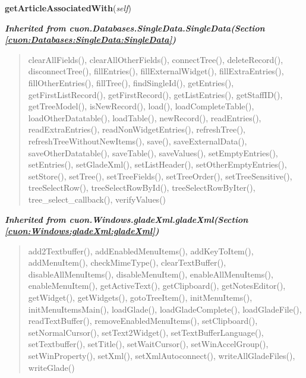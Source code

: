     \vspace{0.5ex}

\hspace{.8\funcindent}\begin{boxedminipage}{\funcwidth}

    \raggedright \textbf{getArticleAssociatedWith}(\textit{self})

\setlength{\parskip}{2ex}
\setlength{\parskip}{1ex}
    \end{boxedminipage}


\large{\textbf{\textit{Inherited from cuon.Databases.SingleData.SingleData\textit{(Section \ref{cuon:Databases:SingleData:SingleData})}}}}

\begin{quote}
clearAllFields(), clearAllOtherFields(), connectTree(), deleteRecord(), disconnectTree(), fillEntries(), fillExternalWidget(), fillExtraEntries(), fillOtherEntries(), fillTree(), findSingleId(), getEntries(), getFirstListRecord(), getFirstRecord(), getListEntries(), getStaffID(), getTreeModel(), isNewRecord(), load(), loadCompleteTable(), loadOtherDatatable(), loadTable(), newRecord(), readEntries(), readExtraEntries(), readNonWidgetEntries(), refreshTree(), refreshTreeWithoutNewItems(), save(), saveExternalData(), saveOtherDatatable(), saveTable(), saveValues(), setEmptyEntries(), setEntries(), setGladeXml(), setListHeader(), setOtherEmptyEntries(), setStore(), setTree(), setTreeFields(), setTreeOrder(), setTreeSensitive(), treeSelectRow(), treeSelectRowById(), treeSelectRowByIter(), tree\_select\_callback(), verifyValues()
\end{quote}

\large{\textbf{\textit{Inherited from cuon.Windows.gladeXml.gladeXml\textit{(Section \ref{cuon:Windows:gladeXml:gladeXml})}}}}

\begin{quote}
add2Textbuffer(), addEnabledMenuItems(), addKeyToItem(), addMenuItem(), checkMimeType(), clearTextBuffer(), disableAllMenuItems(), disableMenuItem(), enableAllMenuItems(), enableMenuItem(), getActiveText(), getClipboard(), getNotesEditor(), getWidget(), getWidgets(), gotoTreeItem(), initMenuItems(), initMenuItemsMain(), loadGlade(), loadGladeComplete(), loadGladeFile(), readTextBuffer(), removeEnabledMenuItems(), setClipboard(), setNormalCursor(), setText2Widget(), setTextBufferLanguage(), setTextbuffer(), setTitle(), setWaitCursor(), setWinAccelGroup(), setWinProperty(), setXml(), setXmlAutoconnect(), writeAllGladeFiles(), writeGlade()
\end{quote}

